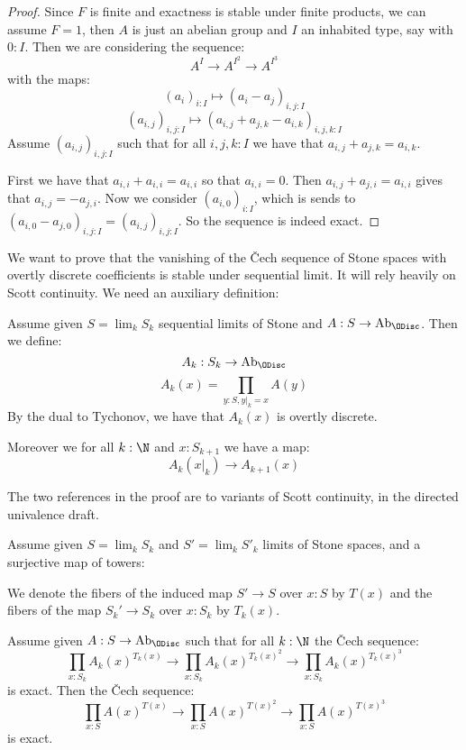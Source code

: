 \begin{proof}
Since $F$ is finite and exactness is stable under finite products, we can assume $F=1$, then $A$ is just an abelian group and $I$ an inhabited type, say with $0:I$. Then we are considering the sequence:
\[A^I \to A^{I^2} \to A^{I^3}\]
with the maps:
\[(a_i)_{i:I} \mapsto (a_i-a_j)_{i,j:I}\]
\[(a_{i,j})_{i,j:I} \mapsto (a_{i,j}+a_{j,k}-a_{i,k})_{i,j,k:I}\]
Assume $(a_{i,j})_{i,j:I}$ such that for all $i,j,k:I$ we have that $a_{i,j}+a_{j,k}=a_{i,k}$. 

First we have that $a_{i,i}+a_{i,i}=a_{i,i}$ so that $a_{i,i}=0$. Then $a_{i,j}+a_{j,i} = a_{i,i}$ gives that $a_{i,j} = -a_{j,i}$. Now we consider $(a_{i,0})_{i:I}$, which is sends to $(a_{i,0}-a_{j,0})_{i,j:I} = (a_{i,j})_{i,j:I}$. So the sequence is indeed exact.
\end{proof}

We want to prove that the vanishing of the \v{C}ech sequence of Stone spaces with overtly discrete coefficients is stable under sequential limit. It will rely heavily on Scott continuity. We need an auxiliary definition:

\begin{definition}
Assume given $S = \lim_kS_k$ sequential limits of Stone and $A:S\to \mathrm{Ab}_\ODisc$. Then we define:
\[A_k: S_k\to \mathrm{Ab}_{\ODisc}\]
\[A_k(x) = \prod_{y:S,y|_k=x} A(y)\]
By the dual to Tychonov, we have that $A_k(x)$ is overtly discrete. 

Moreover we for all $k:\N$ and $x:S_{k+1}$ we have a map:
\[A_k(x|_k) \to A_{k+1}(x)\]
\end{definition}

The two references in the proof are to variants of Scott continuity, in the directed univalence draft.

\begin{lemma}\label{vanishing-cech-stable-sequential-limits}
Assume given $S=\lim_kS_k$ and $S'=\lim_kS'_k$ limits of Stone spaces, and a surjective map of towers:
\begin{center}
\end{center}

We denote the fibers of the induced map $S'\to S$ over $x:S$ by $T(x)$ and the fibers of the map $S_k'\to S_k$ over $x:S_k$ by $T_k(x)$.

Assume given $A:S\to\mathrm{Ab}_\ODisc$ such that for all $k:\N$ the \v{C}ech sequence:
\[\prod_{x:S_k}A_k(x)^{T_k(x)} \to \prod_{x:S_k}A_k(x)^{T_k(x)^2}  \to \prod_{x:S_k}A_k(x)^{T_k(x)^3} \]
is exact. Then the \v{C}ech sequence:
\[\prod_{x:S}A(x)^{T(x)} \to \prod_{x:S}A(x)^{T(x)^2}  \to \prod_{x:S}A(x)^{T(x)^3} \]
is exact.
\end{lemma}

